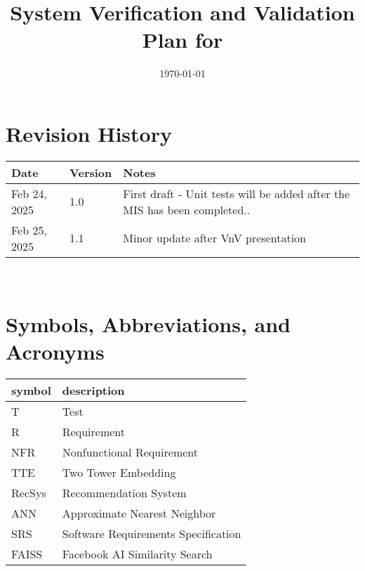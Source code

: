 \documentclass[12pt, titlepage]{article}
\begin{document}
\title{System Verification and Validation Plan for \progname{}} 
\author{\authname}
\date{\today}
	
\maketitle


\section*{Revision History}

\begin{tabularx}{\textwidth}{p{3cm}p{2cm}X}
\toprule {\bf Date} & {\bf Version} & {\bf Notes}\\
\midrule
Feb 24, 2025 & 1.0 & First draft - Unit tests will be added after the MIS has been completed..\\
Feb 25, 2025 & 1.1 & Minor update after VnV presentation\\
\bottomrule
\end{tabularx}

~\\

\newpage

\tableofcontents

\listoftables

\newpage

\section{Symbols, Abbreviations, and Acronyms}

\renewcommand{\arraystretch}{1.2}
\begin{tabular}{l l} 
  \toprule		
  \textbf{symbol} & \textbf{description}\\
  \midrule 
  T & Test\\
  R & Requirement\\
  NFR & Nonfunctional Requirement\\
  TTE & Two Tower Embedding\\
  RecSys & Recommendation System\\
  ANN & Approximate Nearest Neighbor\\
  SRS & Software Requirements Specification\\
  FAISS & Facebook AI Similarity Search\\

  \bottomrule
\end{tabular}\\
\end{document}
